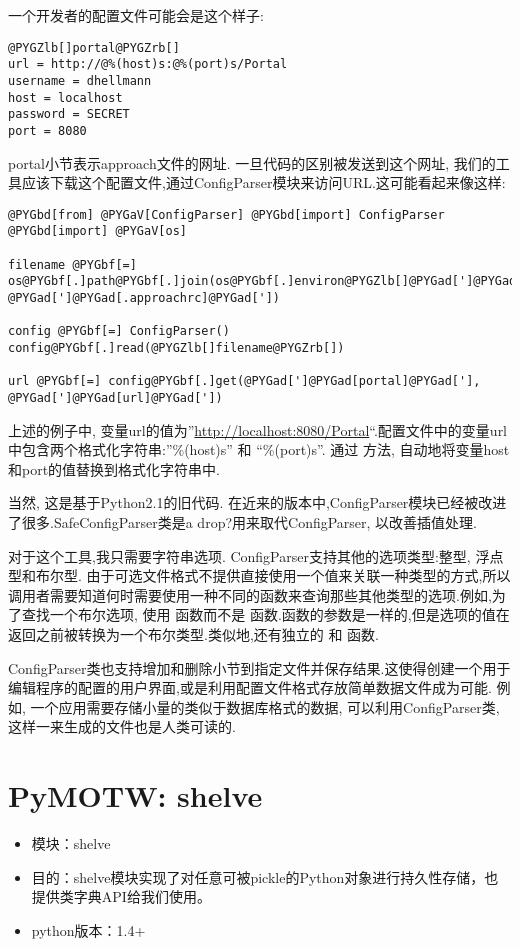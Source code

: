 \documentclass[letterpaper,10pt,english]{manual}
\begin{document}
一个开发者的配置文件可能会是这个样子:

\begin{Verbatim}[commandchars=@\[\]]
@PYGZlb[]portal@PYGZrb[]
url = http://@%(host)s:@%(port)s/Portal
username = dhellmann
host = localhost
password = SECRET
port = 8080
\end{Verbatim}

portal小节表示approach文件的网址. 一旦代码的区别被发送到这个网址, 我们的工具应该下载这个配置文件,通过ConfigParser模块来访问URL.这可能看起来像这样:

\begin{Verbatim}[commandchars=@\[\]]
@PYGbd[from] @PYGaV[ConfigParser] @PYGbd[import] ConfigParser
@PYGbd[import] @PYGaV[os]

filename @PYGbf[=] os@PYGbf[.]path@PYGbf[.]join(os@PYGbf[.]environ@PYGZlb[]@PYGad[']@PYGad[HOME]@PYGad[']@PYGZrb[], @PYGad[']@PYGad[.approachrc]@PYGad['])

config @PYGbf[=] ConfigParser()
config@PYGbf[.]read(@PYGZlb[]filename@PYGZrb[])

url @PYGbf[=] config@PYGbf[.]get(@PYGad[']@PYGad[portal]@PYGad['], @PYGad[']@PYGad[url]@PYGad['])
\end{Verbatim}

上述的例子中, 变量url的值为''\href{http://localhost:8080/Portal}{http://localhost:8080/Portal}``.配置文件中的变量url中包含两个格式化字符串:''\%(host)s'' 和 ``\%(port)s''. 通过  方法, 自动地将变量host和port的值替换到格式化字符串中.

当然, 这是基于Python2.1的旧代码. 在近来的版本中,ConfigParser模块已经被改进了很多.SafeConfigParser类是a drop?用来取代ConfigParser, 以改善插值处理.

对于这个工具,我只需要字符串选项. ConfigParser支持其他的选项类型:整型, 浮点型和布尔型. 由于可选文件格式不提供直接使用一个值来关联一种类型的方式,所以调用者需要知道何时需要使用一种不同的函数来查询那些其他类型的选项.例如,为了查找一个布尔选项, 使用  函数而不是  函数.函数的参数是一样的,但是选项的值在返回之前被转换为一个布尔类型.类似地,还有独立的  和  函数.

ConfigParser类也支持增加和删除小节到指定文件并保存结果.这使得创建一个用于编辑程序的配置的用户界面,或是利用配置文件格式存放简单数据文件成为可能. 例如, 一个应用需要存储小量的类似于数据库格式的数据, 可以利用ConfigParser类,这样一来生成的文件也是人类可读的.

\resetcurrentobjects


\section{PyMOTW: shelve}
\begin{itemize}
\item {} 
模块：shelve

\item {} 
目的：shelve模块实现了对任意可被pickle的Python对象进行持久性存储，也提供类字典API给我们使用。

\item {} 
python版本：1.4+

\end{itemize}
\end{document}
